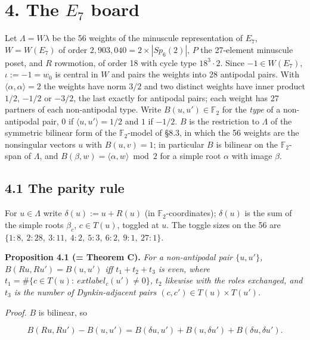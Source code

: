 \documentclass[
]{article}
\begin{document}
\section{\texorpdfstring{4. The \(E_7\)
board}{4. The E\_7 board}}\label{the-e_7-board}

Let \(\Lambda = W\lambda\) be the 56 weights of the minuscule
representation of \(E_7\), \(W = W(E_7)\) of order
\(2{,}903{,}040 = 2 \times |Sp_6(2)|\), \(P\) the 27-element minuscule
poset, and \(R\) rowmotion, of order 18 with cycle type \(18^3\cdot 2\).
Since \(-1 \in W(E_7)\), \(\iota := -1 = w_0\) is central in \(W\) and
pairs the weights into 28 antipodal pairs. With
\(\langle \alpha,\alpha\rangle = 2\) the weights have norm \(3/2\) and
two distinct weights have inner product \(1/2\), \(-1/2\) or \(-3/2\),
the last exactly for antipodal pairs; each weight has 27 partners of
each non-antipodal type. Write \(B(u,u') \in \mathbb{F}_2\) for the
\emph{type} of a non-antipodal pair, \(0\) if
\(\langle u,u' \rangle = 1/2\) and \(1\) if \(-1/2\). \(B\) is the
restriction to \(\Lambda\) of the symmetric bilinear form of the
\(\mathbb{F}_2\)-model of §8.3, in which the 56 weights are the
nonsingular vectors \(u\) with \(B(u,v)=1\); in particular \(B\) is
bilinear on the \(\mathbb{F}_2\)-span of \(\Lambda\), and
\(B(\beta, w) = \langle \alpha, w \rangle \bmod 2\) for a simple root
\(\alpha\) with image \(\beta\).

\subsection{4.1 The parity rule}\label{the-parity-rule}

For \(u \in \Lambda\) write \(\delta(u) := u + R(u)\) (in
\(\mathbb{F}_2\)-coordinates); \(\delta(u)\) is the sum of the simple
roots \(\beta_c\), \(c \in T(u)\), toggled at \(u\). The toggle sizes on
the 56 are
\(\{1 : 8,\ 2 : 28,\ 3 : 11,\ 4 : 2,\ 5 : 3,\ 6 : 2,\ 9 : 1,\ 27 : 1\}\).

\textbf{Proposition 4.1 (= Theorem C).} \emph{For a non-antipodal pair
\(\{u,u'\}\), \(B(Ru, Ru') = B(u,u')\) iff \(t_1 + t_2 + t_3\) is even,
where \(t_1 = \#\{c \in T(u) : \  ext{label}_c(u') \ne 0\}\), \(t_2\)
likewise with the roles exchanged, and \(t_3\) is the number of
Dynkin-adjacent pairs \((c, c') \in T(u) \times T(u')\).}

\emph{Proof.} \(B\) is bilinear, so

\[B(Ru, Ru') - B(u,u') = B(\delta u, u') + B(u, \delta u') + B(\delta u, \delta u') .\]
\end{document}
